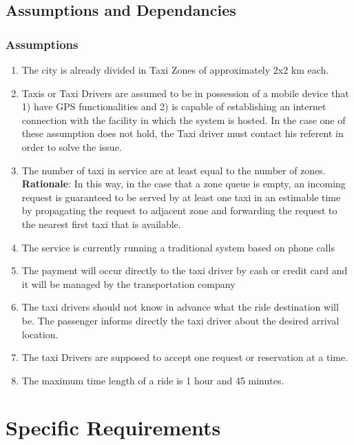 \documentclass[11pt, a4paper,titlepage]{article}
\begin{document}
\subsection{Assumptions and Dependancies}
\subsubsection{Assumptions}
	\begin{enumerate}
		\item \label{itm: Assumption_Zones} The city is already divided in Taxi Zones of approximately 2x2 km each. 
		\item \label{itm: Assumption_MobileProvisioning} Taxis or Taxi Drivers are assumed to be in possession of a mobile device that  1) have GPS functionalities and 2) is capable of establishing an internet connection with the facility in which the system is hosted. In the case one of these assumption does not hold, the Taxi driver must contact his referent in order to solve the issue.
		\item \label{itm: Assumption_NumberOfTaxis} The number of taxi in service are at least equal to the number of zones.
		\textbf{Rationale}: In this way, in the case that a zone queue is empty, an incoming request is guaranteed to be served by at least one taxi in an estimable time by propagating the request to adjacent zone and forwarding the request to the nearest first taxi that is available.
		\item \label{itm: Assumption_FormerSystems} The service is currently running a traditional system based on phone calls	
		\item \label{itm: Assumption_Payment} The payment will occur directly to the taxi driver by cash or credit card and it will be managed by the transportation company
		\item \label{itm: Assumption_Destination} The taxi drivers should not know in advance what the ride destination will be. The passenger informs directly the taxi driver about the desired arrival location.
		\item \label{itm: Assumption_OneReservation} The taxi Drivers are supposed to accept one request or reservation at a time.
		\item \label{itm: Assumption_LengthTime} The maximum time length of a ride is 1 hour and 45 minutes.
		
	\end{enumerate}
\pagebreak
\section{Specific Requirements}
\end{document}
